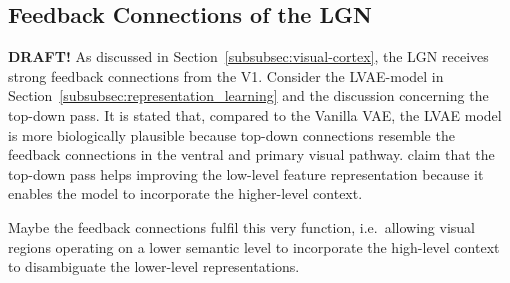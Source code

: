 \subsection{Feedback Connections of the \acl{LGN}}\label{subsec:feedback-connections-of-the-lateral-geniculate-nucleus}
\textbf{DRAFT!}
As discussed in Section~\ref{subsubsec:visual-cortex}, the \ac{LGN} receives strong feedback connections from the \ac{V1}.
Consider the \ac{LVAE}-model in Section~\ref{subsubsec:representation_learning} and the discussion concerning the top-down pass.
It is stated that, compared to the Vanilla VAE, the \ac{LVAE} model is more biologically plausible because top-down connections resemble the feedback connections in the ventral and primary visual pathway.
\citet{sonderby2016ladder} claim that the top-down pass helps improving the low-level feature representation because it enables the model to incorporate the higher-level context.

Maybe the feedback connections fulfil this very function, i.e.\ allowing visual regions operating on a lower semantic level to incorporate the high-level context to disambiguate the lower-level representations.

